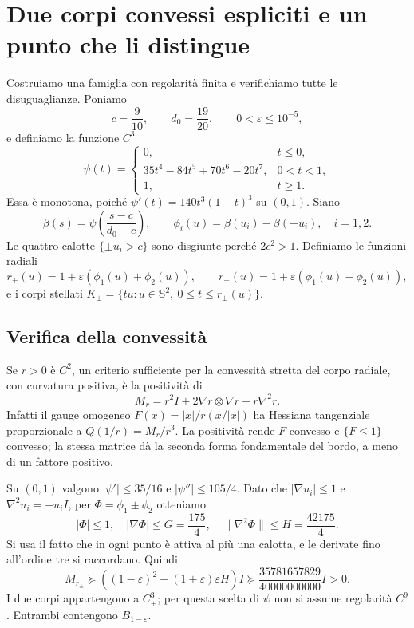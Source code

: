 \documentclass[11pt,a4paper]{article}
\theoremstyle{remark}
\newcommand{\Sph}{\mathbb S^2}
\begin{document}
\section{Due corpi convessi espliciti e un punto che li distingue}
Costruiamo una famiglia con regolarità finita e verifichiamo tutte le
disuguaglianze. Poniamo
\[
c=\frac9{10},\qquad d_0=\frac{19}{20},\qquad 0<\varepsilon\le10^{-5},
\]
e definiamo la funzione $C^3$
\[
\psi(t)=
\begin{cases}
0,&t\le0,\\
35t^4-84t^5+70t^6-20t^7,&0<t<1,\\
1,&t\ge1.
\end{cases}
\]
Essa è monotona, poiché $\psi'(t)=140t^3(1-t)^3$ su $(0,1)$.
Siano
\[
\beta(s)=\psi\left(\frac{s-c}{d_0-c}\right),\qquad
\phi_i(u)=\beta(u_i)-\beta(-u_i),\quad i=1,2.
\]
Le quattro calotte $\{\pm u_i>c\}$ sono disgiunte perché $2c^2>1$.
Definiamo le funzioni radiali
\[
r_+(u)=1+\varepsilon(\phi_1(u)+\phi_2(u)),\qquad
r_-(u)=1+\varepsilon(\phi_1(u)-\phi_2(u)),
\]
e i corpi stellati $K_\pm=\{tu:u\in\Sph,\ 0\le t\le r_\pm(u)\}$.

\subsection*{Verifica della convessità}
Se $r>0$ è $C^2$, un criterio sufficiente per la convessità stretta del
corpo radiale, con curvatura positiva, è la positività di
\begin{equation}\label{eq:radial}
M_r=r^2 I+2\nabla r\otimes\nabla r-r\nabla^2r.
\end{equation}
Infatti il gauge omogeneo $F(x)=|x|/r(x/|x|)$ ha Hessiana tangenziale
proporzionale a
$Q(1/r)=M_r/r^3$. La positività rende $F$ convesso e $\{F\le1\}$ convesso;
la stessa matrice dà la seconda forma fondamentale del bordo, a meno di
un fattore positivo.

Su $(0,1)$ valgono $|\psi'|\le35/16$ e $|\psi''|\le105/4$.
Dato che $|\nabla u_i|\le1$ e $\nabla^2u_i=-u_i I$, per
$\Phi=\phi_1\pm\phi_2$ otteniamo
\[
|\Phi|\le1,\quad |\nabla\Phi|\le G=\frac{175}{4},\quad
\|\nabla^2\Phi\|\le H=\frac{42175}{4}.
\]
Si usa il fatto che in ogni punto è attiva al più una calotta, e le
derivate fino all'ordine tre si raccordano. Quindi
\[
M_{r_\pm}\succeq
\left((1-\varepsilon)^2-(1+\varepsilon)\varepsilon H\right)I
\succeq\frac{35781657829}{40000000000}I>0.
\]
I due corpi appartengono a $C^3_+$; per questa scelta di $\psi$ non si
assume regolarità $C^9$. Entrambi contengono $B_{1-\varepsilon}$.
\end{document}
